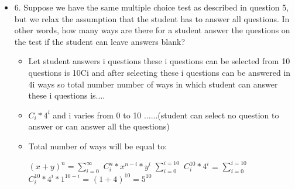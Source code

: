 \documentclass[11pt]{article}
\begin{document}
\begin{itemize}
\item 6. Suppose we have the same multiple choice test as described in question 5, but we relax the assumption
that the student has to answer all questions. In other words, how many ways are there for a student
answer the questions on the test if the student can leave answers blank?
\begin{itemize}
\item Let student answers i questions these i questions can be selected from 10 questions is 10Ci and after selecting these i questions can be answered in 4i ways so total number number of ways in which student can answer these i questions is....
\item $C_i * 4^{i}$ and i varies from 0 to 10 ......(student can select no question to answer or can answer all the questions)
\item Total number of ways will be equal to:

$(x + y)^{n} = \sum_{i=0}^{\infty}$  $C_{i}^{n} * x^{n-i} * y^{i}$ 
\vskip 0.1in 
$\sum_{i=0}^{i=10}$  $C_{i}^{10} * 4^{i} $ = $\sum_{i=0}^{i=10}$ $C_{i}^{10} * 4^{i} * 1^{10-i}$ = $(1+4)^{10} = 5^{10}$
\end{itemize} 
\end{itemize} 
\end{document}
